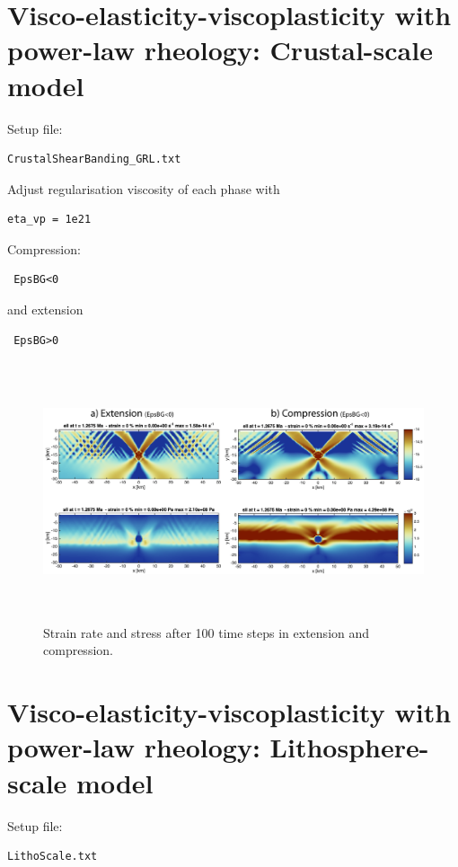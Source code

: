 \documentclass[12pt,english,openany]{scrbook}
\begin{document}
\section{Visco-elasticity-viscoplasticity with power-law rheology: Crustal-scale model}

Setup file:
\begin{verbatim} 
CrustalShearBanding_GRL.txt
\end{verbatim}

Adjust regularisation viscosity of each phase with
\begin{verbatim} 
eta_vp = 1e21
\end{verbatim}

Compression: \begin{verbatim} EpsBG<0 \end{verbatim}
and extension \begin{verbatim} EpsBG>0 \end{verbatim}

\begin{figure}[ht!]
\centerline{\includegraphics[height=3.0in]{./Figures/Extension_Compression_MDOODZ.png}}
\caption{Strain rate and stress after 100 time steps in extension and compression.}
\label{Extension_Compression_MDOODZ}
\end{figure}

\section{Visco-elasticity-viscoplasticity with power-law rheology: Lithosphere-scale model}

Setup file:
\begin{verbatim} 
LithoScale.txt
\end{verbatim}
\end{document}
